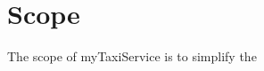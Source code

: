 \documentclass[../../../../dd.tex]{subfiles}
\begin{document}
	\section{Scope}
		The scope of myTaxiService is to simplify the 
\end{document}

